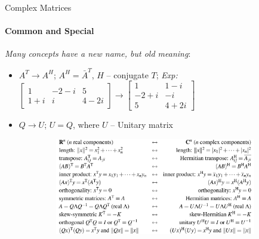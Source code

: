 \documentclass[aspectratio=169]{beamer}
\begin{document}
\begin{frame}[t]{Complex Matrices}
\framesubtitle{Common and Special}
\vspace{-0.3cm}
    \large \textit{Many concepts have a new name, but old meaning}:
    \vspace{-0.25cm}
    \begin{itemize}
        \item $A^T \rightarrow A^H$; $A^H = \bar{A}^T$, $H$ -- conjugate $T$; \textit{Exp:} {\scriptsize $\begin{bmatrix}
        1 & -2-i & 5 \\
        1+i & i & 4-2i 
        \end{bmatrix} \rightarrow \begin{bmatrix}
        1 & 1-i \\
        -2+i & -i \\ 
        5 & 4+2i 
        \end{bmatrix}$}
        \vspace{-0.3cm}
        \item $Q \rightarrow U$; $U=Q$, where $U$ -- Unitary matrix
    \end{itemize}
    \vspace{-0.38cm}
    \begin{figure}[H]
        \centering\includegraphics[height=4.2cm,width=1\textwidth,keepaspectratio]{complex_matrices.png}
        \label{fig:complex_matrices.png}
    \end{figure}
\end{frame}
\end{document}
